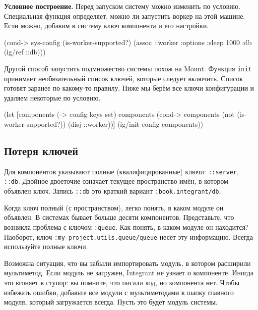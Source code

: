 
\textbf{Условное построение.} Перед запуском систему можно изменить по
условию. Специальная функция определяет, можно ли запустить воркер на этой
машине. Если можно, добавим в систему ключ компонента и его настройки.

\begin{english}
  \begin{clojure}
(cond-> sys-config
  (is-worker-supported?)
  (assoc ::worker {:options {:sleep 1000}
                   :db (ig/ref ::db)}))
  \end{clojure}
\end{english}

Другой способ запустить подмножество системы похож на Mount. Функция
\verb|init| принимает необязательный список ключей, которые следует
включить. Список готовят заранее по какому-то правилу. Ниже мы берём все
ключи конфигурации и удаляем некоторые по условию.

\begin{english}
  \begin{clojure}
(let [components (-> config keys set)
      components (cond-> components
                   (not (is-worker-supported?))
                   (disj ::worker))]
  (ig/init config components))
  \end{clojure}
\end{english}

\subsection{Потеря ключей}


Для компонентов указывают полные (квалифицированные) ключи: \verb|::server|,
\verb|::db|. Двойное двоеточие означает текущее пространство имён, в котором
объявлен ключ. Запись \verb|::db| это краткий вариант
\verb|:book.integrant/db|.

Когда ключ полный (с пространством), легко понять, в каком модуле он объявлен. В
системах бывает больше десяти компонентов. Представьте, что возникла проблема с
ключом \verb|:queue|. Как понять, в каком модуле он находится?  Наоборот, ключ
\verb|:my-project.utils.queue/queue| несёт эту информацию. Всегда используйте
полные ключи.

Возможна ситуация, что вы забыли импортировать модуль, в котором расширили
мультиметод. Если модуль не загружен, Integrant не узнает о компоненте. Иногда
это вгоняет в ступор: вы помните, что писали код, но компонента нет. Чтобы
избежать ошибки, добавьте все модули с мультиметодами в шапку главного модуля,
который загружается всегда. Пусть это будет модуль системы.

